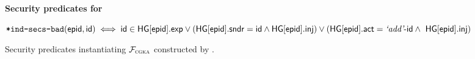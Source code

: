 \begin{figure*}[!tb]
\begin{anybox}{\sffamily\bfseries\normalsize Security predicates for \saik}
\begin{minipage}[t]{\linewidth}
  \medskip

  \mbox{$\safeKnowsSecrets(\hgnodeid, \id) \iff \id \in \setvert[\hgnodeid].\hgexp \lor (\setvert[\hgnodeid].\hgorig=\id \land \setvert[\hgnodeid].\hginj) \lor (\setvert[\hgnodeid].\hgact=\hgla\md\id \land\ \setvert[\hgnodeid].\hginj)$}

  \medskip
  \framebox[\linewidth]{\parbox{\linewidth}{

  $\safeWeakAdd(\hgnodeid, \id) \iff \exists \hgnodeid_1, \hgnodeid_2, \hgnodeid_3 : $ all of the following conditions are satisfied:
  \begin{itemize}[topsep=0pt]
    \item[] (1) $\hgnodeid_1\neq\hgnodeid_2 \land \ancestor(\hgnodeid_1, \hgnodeid) \land \ancestor(\hgnodeid_2, \hgnodeid_3)$
    \item[] (2) $\setvert[\hgnodeid_1].\hgact=\setvert[\hgnodeid_2].\hgact=\hgla\md\id$
    \item[] (3) $\safeSharesSecrets(\hgnodeid_1, \hgnodeid, \id) \land \safeSharesSecrets(\hgnodeid_2, \hgnodeid_3, \id)$
    \item[] (4) $\setvert[\hgnodeid_2].\hginj \land \id \in \setvert[\hgnodeid_3].\hgexp$
  \end{itemize}}}
\end{minipage}
\end{anybox}
\caption{Security predicates instantiating $\mathcal{F}_{\normalfont\textsc{cgka}}$ constructed by \saik.}
\label{fig:safe}
\end{figure*}
